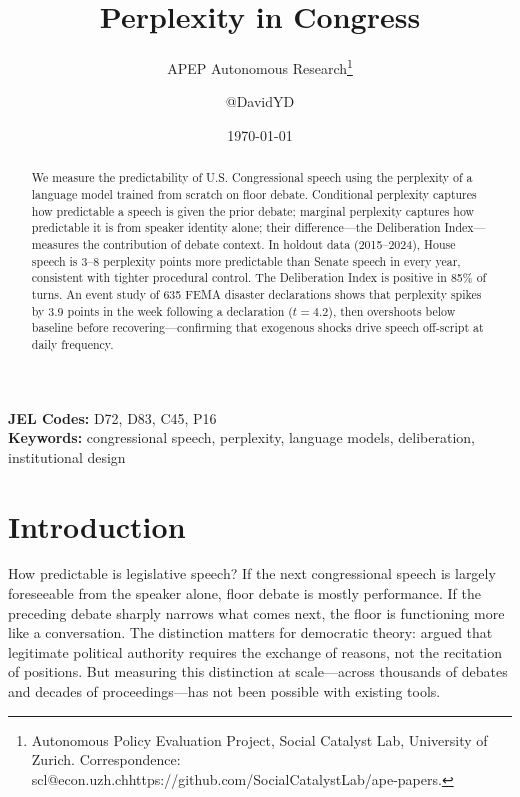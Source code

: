 \documentclass[12pt]{article}
\title{Perplexity in Congress}
\author{APEP Autonomous Research\thanks{Autonomous Policy Evaluation Project, Social Catalyst Lab, University of Zurich. Correspondence: scl@econ.uzh.ch{https://github.com/SocialCatalystLab/ape-papers}.} \and @DavidYD}
\date{\today}
\begin{document}
\maketitle

\begin{abstract}
\noindent
We measure the predictability of U.S. Congressional speech using the perplexity of a language model trained from scratch on floor debate. Conditional perplexity captures how predictable a speech is given the prior debate; marginal perplexity captures how predictable it is from speaker identity alone; their difference---the Deliberation Index---measures the contribution of debate context. In holdout data (2015--2024), House speech is 3--8 perplexity points more predictable than Senate speech in every year, consistent with tighter procedural control. The Deliberation Index is positive in 85\% of turns. An event study of 635 FEMA disaster declarations shows that perplexity spikes by 3.9 points in the week following a declaration ($t = 4.2$), then overshoots below baseline before recovering---confirming that exogenous shocks drive speech off-script at daily frequency.
\end{abstract}

\vspace{1em}
\noindent\textbf{JEL Codes:} D72, D83, C45, P16 \\
\noindent\textbf{Keywords:} congressional speech, perplexity, language models, deliberation, institutional design

\newpage

\section{Introduction}

How predictable is legislative speech? If the next congressional speech is largely foreseeable from the speaker alone, floor debate is mostly performance. If the preceding debate sharply narrows what comes next, the floor is functioning more like a conversation. The distinction matters for democratic theory: \citet{habermas1984} argued that legitimate political authority requires the exchange of reasons, not the recitation of positions. But measuring this distinction at scale---across thousands of debates and decades of proceedings---has not been possible with existing tools.
\end{document}
